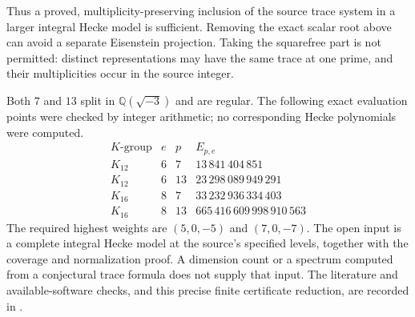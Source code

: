 Thus a proved, multiplicity-preserving inclusion of the source
trace system in a larger integral Hecke model is sufficient.
Removing the exact scalar root above can avoid a separate
Eisenstein projection. Taking the squarefree part is not permitted:
distinct representations may have the same trace at one prime,
and their multiplicities occur in the source integer.

Both $7$ and $13$ split in $\mathbb Q(\sqrt{-3})$ and are regular.
The following exact evaluation points were checked by integer
arithmetic; no corresponding Hecke polynomials were computed.
\[
\begin{array}{c|r|r|r}
K\text{-group}&e&p&E_{p,e}\\\hline
K_{12}&6&7&13\,841\,404\,851\\
K_{12}&6&13&23\,298\,089\,949\,291\\
K_{16}&8&7&33\,232\,936\,334\,403\\
K_{16}&8&13&665\,416\,609\,998\,910\,563
\end{array}
\]
The required highest weights are $(5,0,-5)$ and $(7,0,-7)$.
The open input is a complete integral Hecke model at the source's
specified levels, together with the coverage and normalization
proof. A dimension count or a spectrum computed from a
conjectural trace formula does not supply that input. The
literature and available-software checks, and this precise finite
certificate reduction, are recorded in
.

